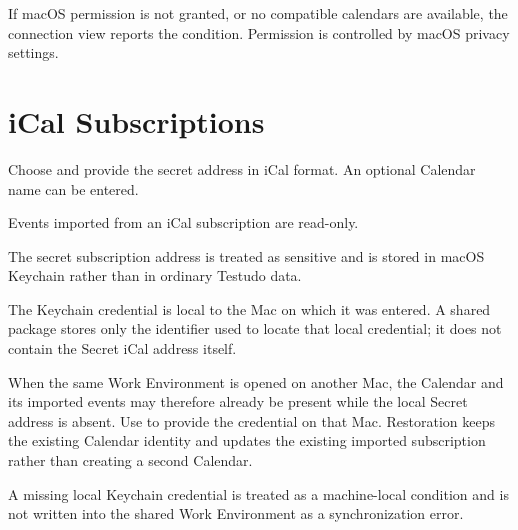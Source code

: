 \documentclass{testudomanual}
\begin{document}
If macOS permission is not granted, or no compatible calendars are available, the connection view reports the condition. Permission is controlled by macOS privacy settings.


\chapter{iCal Subscriptions}

Choose  and provide the secret address in iCal format. An optional Calendar name can be entered.

Events imported from an iCal subscription are read-only.

The secret subscription address is treated as sensitive and is stored in macOS Keychain rather than in ordinary Testudo data.

The Keychain credential is local to the Mac on which it was entered. A shared  package stores only the identifier used to locate that local credential; it does not contain the Secret iCal address itself.

When the same Work Environment is opened on another Mac, the Calendar and its imported events may therefore already be present while the local Secret address is absent. Use  to provide the credential on that Mac. Restoration keeps the existing Calendar identity and updates the existing imported subscription rather than creating a second Calendar.

A missing local Keychain credential is treated as a machine-local condition and is not written into the shared Work Environment as a synchronization error.


\end{document}
